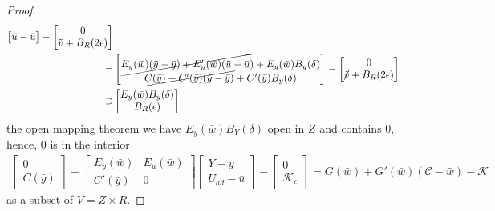 \begin{proof}
\begin{align*}
\begin{bmatrix}
	 		\tilde{u} - \bar{u}
	 	\end{bmatrix}
	 	- 
	 	\begin{bmatrix}
	 		0\\
	 		\tilde{v} + B_R(2 \epsilon)
	 	\end{bmatrix}\\
	 	=& 
	 	\begin{bmatrix}
	 		\cancel{E_y(\bar{w})(\tilde{y} - \bar{y}) + E_u'(\bar{w})( \tilde{u} - \bar{u})} + E_y(\bar{w}) B_y(\delta)\\
	 		\cancel{C(\bar{y}) + C'(\bar{y})(\tilde{y} - \bar{y}) }+ C'(\bar{y})B_y(\delta) 
	 	\end{bmatrix}
	 	-
	 	\begin{bmatrix}
	 		0\\
	 		\cancel{\bar{v}} + B_R(2\epsilon) 
	 	\end{bmatrix}
	 	\\
	 	\supset&
	 	\begin{bmatrix}
	 		E_y(\bar{w}) B_y(\delta)\\
	 		B_R(\epsilon)
	 	\end{bmatrix}
	 \end{align*}
	 the open mapping theorem we have $E_y(\bar{w}) B_Y(\delta)$ open in $Z$ and contains $0$, hence, $0$ is in the interior 
	 \begin{align*}
\begin{bmatrix}
	 		0\\
	 		C(\bar{y})
	 	\end{bmatrix}
	 	+ 
	 	\begin{bmatrix}
	 		E_y(\bar{w}) & E_u(\bar{w})\\
	 		C'(\bar{y}) & 0
	 	\end{bmatrix}
	 	\begin{bmatrix}
	 		Y - \bar{y}\\
	 		U_{ad} - \bar{u}
	 	\end{bmatrix}
	 	-
	 	\begin{bmatrix}
	 		0\\
	 		\mathcal{K}_c
	 	\end{bmatrix}
	 	= G(\bar{w}) + G'(\bar{w})(\mathcal{C} - \bar{w}) - \mathcal{K}
	 \end{align*}
	 as a subset of $V = Z \times R$. 
\end{proof}

